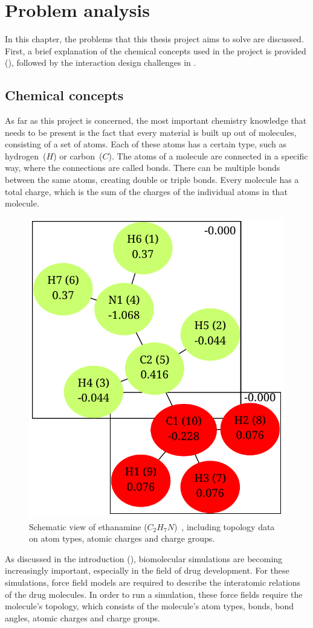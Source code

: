 \chapter{Problem analysis}

In this chapter, the problems that this thesis project aims to solve are discussed. First, a brief explanation of the chemical concepts used in the project is provided (), followed by the interaction design challenges in .

\section{Chemical concepts}
As far as this project is concerned, the most important chemistry knowledge that needs to be present is the fact that every material is built up out of molecules, consisting of a set of atoms. Each of these atoms has a certain type, such as hydrogen~($H$) or carbon~($C$). The atoms of a molecule are connected in a specific way, where the connections are called bonds. There can be multiple bonds between the same atoms, creating double or triple bonds. Every molecule has a total charge, which is the sum of the charges of the individual atoms in that molecule.

\begin{figure}
\vspace{-2em}
\begin{center}
\includegraphics[width=.38\textwidth]{img/ethanamine.pdf}
\caption{Schematic view of ethanamine ($C_{2}H_{7}N$)~\cite{atb2014ethanamine}, including topology data on atom types, atomic charges and charge groups.}
\end{center}
\vspace{-2em}
\end{figure}

As discussed in the introduction (), biomolecular simulations are becoming increasingly important, especially in the field of drug development. For these simulations, force field models are required to describe the interatomic relations of the drug molecules. In order to run a simulation, these force fields require the molecule's topology, which consists of the molecule's atom types, bonds, bond angles, atomic charges and charge groups.

